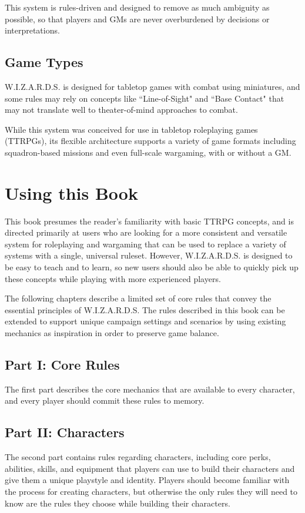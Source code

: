 This system is rules-driven and designed to remove as much 
ambiguity as possible,
so that players and GMs are never overburdened by 
decisions or interpretations.



\subsection{Game Types}
W.I.Z.A.R.D.S. is designed for tabletop games with combat using miniatures, 
and some rules may rely on concepts like ``Line-of-Sight" and ``Base Contact" 
that may not translate well to theater-of-mind approaches to combat.

\vspace{0.4em}

While this system was conceived for use in tabletop roleplaying games (TTRPGs),
its flexible architecture supports a variety of game formats including 
squadron-based missions and even full-scale wargaming,
with or without a GM.



\section{Using this Book}
This book presumes the reader's familiarity with basic TTRPG concepts,
and is directed primarily at users who are looking for a more consistent 
and versatile system for roleplaying and wargaming that can be used
to replace a variety of systems with a single, universal ruleset.
However, W.I.Z.A.R.D.S. is designed to be easy to teach and to learn,
so new users should also be able to quickly pick up these concepts 
while playing with more experienced players.

\vspace{0.4em}

The following chapters describe a limited set of core rules that convey
the essential principles of W.I.Z.A.R.D.S. 
The rules described in this book can be extended to support 
unique campaign settings and scenarios
by using existing mechanics as inspiration
in order to preserve game balance.

\subsection{Part I: Core Rules}
The first part describes the core mechanics that are available to 
every character, and every player should commit these rules to memory.

\subsection{Part II: Characters}
The second part contains rules regarding characters, 
including core perks, abilities, skills, and equipment that players can use to 
build their characters and give them a unique playstyle and identity.
Players should become familiar with the process for creating characters,
but otherwise the only rules they will need to know are the rules they choose
while building their characters.

